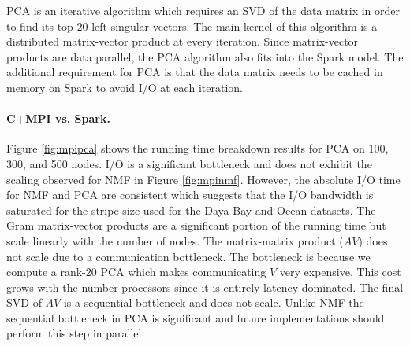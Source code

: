 PCA is an iterative algorithm which requires an SVD of the data matrix in order to find its top-$20$ left singular vectors. The main kernel of this algorithm is a distributed matrix-vector product at every iteration. Since matrix-vector products are data parallel, the PCA algorithm also fits into the Spark model. The additional requirement for PCA is that the data matrix needs to be cached in memory on Spark to avoid I/O at each iteration.

\paragraph{C+MPI vs. Spark.}
Figure \ref{fig:mpipca} shows the running time breakdown results for PCA on 100, 300, and 500 nodes. I/O is a significant bottleneck and does not exhibit the scaling observed for NMF in Figure \ref{fig:mpinmf}. However, the absolute I/O time for NMF and PCA are consistent which suggests that the I/O bandwidth is saturated for the stripe size used for the Daya Bay and Ocean datasets. The Gram matrix-vector products are a significant portion of the running time but scale linearly with the number of nodes. The matrix-matrix product ($AV$) does not scale due to a communication bottleneck. The bottleneck is because we compute a rank-$20$ PCA which makes communicating $V$ very expensive. This cost grows with the number processors since it is entirely latency dominated. The final SVD of $AV$ is a sequential bottleneck and does not scale. Unlike NMF the sequential bottleneck in PCA is significant and future implementations should perform this step in parallel.

